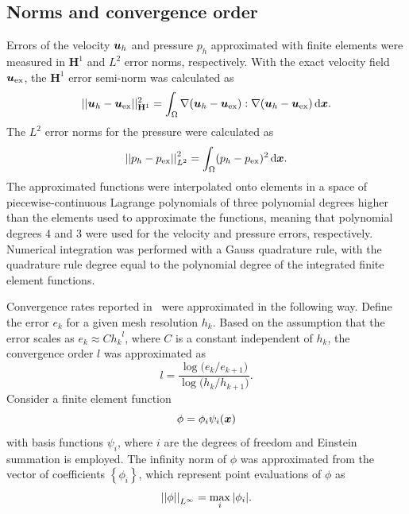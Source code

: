 \documentclass{WileyMSP-template}
\begin{document}
\subsection{Norms and convergence order}\label{subsec:norms_and_eoc}
Errors of the velocity $\bm{u}_h$ and pressure $p_h$ approximated with finite elements
were measured in $\mathbf{H}^1$ and $L^2$ error norms, respectively.
With the exact velocity field $\bm{u}_{\mathrm{ex}}$, the $\mathbf{H}^1$
error semi-norm was calculated as
\begin{equation*}
    \vert\vert\bm{u}_h - \bm{u}_{\mathrm{ex}}\vert\vert_{\mathbf{H}^1}^2
    = \int_{\Omega}\nabla(\bm{u}_h - \bm{u}_{\mathrm{ex}}) : \nabla(\bm{u}_h - \bm{u}_{\mathrm{ex}}) \, \mathrm d\bm{x}.
\end{equation*}
The $L^2$ error norms for the pressure were calculated as
\begin{equation*}
    { \vert\vert p_h - p_{\mathrm{ex}}\vert\vert}_{L^2}^2 = \int_{\Omega}(p_h - p_{\mathrm{ex}})^2 \, \mathrm d\bm{x}.
\end{equation*}
The approximated functions were interpolated onto elements in a space of piecewise-continuous
Lagrange polynomials of three polynomial degrees higher than the elements used to approximate
the functions, meaning that polynomial degrees 4 and 3 were used for the velocity and pressure
errors, respectively. Numerical integration was performed with a Gauss quadrature rule,
with the quadrature rule degree equal to the polynomial degree of the integrated
finite element functions. 

Convergence rates reported in~ were
approximated in the following way. Define the error $e_k$ for a given mesh
resolution $h_k$. Based on the assumption that the error scales as
$e_k \approx C{h_k}^l$, where $C$ is a constant independent of $h_k$,
the convergence order $l$ was approximated as
\begin{equation}
    l = \frac{\log{(e_k/e_{k+1}})}{\log{(h_k/h_{k+1}})}.
    \label{eq:convergence_order_estimate}
\end{equation}
Consider a finite element function 
\begin{equation*}
    \phi = \phi_i\psi_i(\bm{x})
\end{equation*}
with basis functions $\psi_i$, where $i$ are the degrees of freedom and Einstein
summation is employed.
The infinity norm of $\phi$ was approximated from the vector
of coefficients $\left\{\phi_i\right\}$, which represent point evaluations of $\phi$ as
\begin{equation*}
    {\vert\vert\phi\vert\vert}_{L^{\infty}} = \max_i{\vert \phi_i\vert}.
\end{equation*}
\end{document}
